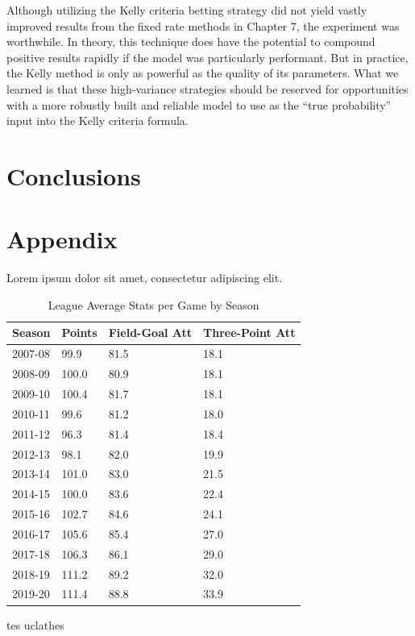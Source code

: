 \documentclass [MS] {uclathes}
\begin{document}
Although utilizing the Kelly criteria betting strategy did not yield vastly improved results from the fixed rate methods in Chapter 7, the experiment was worthwhile. In theory, this technique does have the potential to compound positive results rapidly if the model was particularly performant. But in practice, the Kelly method is only as powerful as the quality of its parameters. What we learned is that these high-variance strategies should be reserved for opportunities with a more robustly built and reliable model to use as the ``true probability'' input into the Kelly criteria formula.

\chapter{Conclusions}


\chapter{Appendix}

Lorem ipsum dolor sit amet, consectetur adipiscing elit.

\begin{table}[]
\centering
\caption{League Average Stats per Game by Season}
\label{tab:season-avgs}
\begin{tabular}{@{}llll@{}}
\toprule
Season & Points & Field-Goal Att & Three-Point Att \\ \midrule
2007-08 & 99.9 & 81.5 & 18.1 \\
2008-09 & 100.0 & 80.9 & 18.1 \\
2009-10 & 100.4 & 81.7 & 18.1 \\
2010-11 & 99.6 & 81.2 & 18.0 \\
2011-12 & 96.3 & 81.4 & 18.4 \\
2012-13 & 98.1 & 82.0 & 19.9 \\
2013-14 & 101.0 & 83.0 & 21.5 \\
2014-15 & 100.0 & 83.6 & 22.4 \\
2015-16 & 102.7 & 84.6 & 24.1 \\
2016-17 & 105.6 & 85.4 & 27.0 \\
2017-18 & 106.3 & 86.1 & 29.0 \\
2018-19 & 111.2 & 89.2 & 32.0 \\
2019-20 & 111.4 & 88.8 & 33.9 \\ \bottomrule
\end{tabular}
\end{table}



 {tes} 
 {uclathes}
\end{document}
